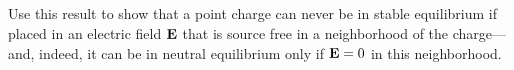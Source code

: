 \documentclass[11pt]{article}
\newenvironment{problem}
{
	\subsection{}
	\color{darkgray}
    \ignorespaces
}
{

}
\begin{document}
\begin{problem}
	Use this result to show that a point charge can never be in stable equilibrium if placed in an electric field $\mathbf{E}$ that is source free in a neighborhood of the charge---and, indeed, it can be in neutral equilibrium only if $\mathbf{E} = 0$ in this neighborhood.
\end{problem}

\end{document}
